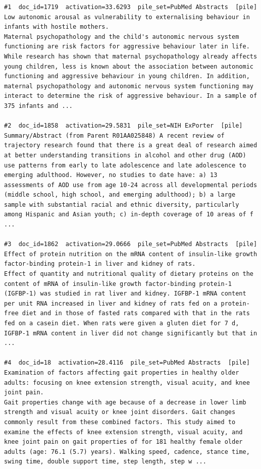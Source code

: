 \begin{verbatim}
#1  doc_id=1719  activation=33.6293  pile_set=PubMed Abstracts  [pile]
Low autonomic arousal as vulnerability to externalising behaviour in infants with hostile mothers.
Maternal psychopathology and the child's autonomic nervous system functioning are risk factors for aggressive behaviour later in life. While research has shown that maternal psychopathology already affects young children, less is known about the association between autonomic functioning and aggressive behaviour in young children. In addition, maternal psychopathology and autonomic nervous system functioning may interact to determine the risk of aggressive behaviour. In a sample of 375 infants and ...

#2  doc_id=1858  activation=29.5831  pile_set=NIH ExPorter  [pile]
Summary/Abstract (from Parent R01AA025848) A recent review of trajectory research found that there is a great deal of research aimed at better understanding transitions in alcohol and other drug (AOD) use patterns from early to late adolescence and late adolescence to emerging adulthood. However, no studies to date have: a) 13 assessments of AOD use from age 10-24 across all developmental periods (middle school, high school, and emerging adulthood); b) a large sample with substantial racial and ethnic diversity, particularly among Hispanic and Asian youth; c) in-depth coverage of 10 areas of f ...

#3  doc_id=1862  activation=29.0666  pile_set=PubMed Abstracts  [pile]
Effect of protein nutrition on the mRNA content of insulin-like growth factor-binding protein-1 in liver and kidney of rats.
Effect of quantity and nutritional quality of dietary proteins on the content of mRNA of insulin-like growth factor-binding protein-1 (IGFBP-1) was studied in rat liver and kidney. IGFBP-1 mRNA content per unit RNA increased in liver and kidney of rats fed on a protein-free diet and in those of fasted rats compared with that in the rats fed on a casein diet. When rats were given a gluten diet for 7 d, IGFBP-1 mRNA content in liver did not change significantly but that in ...

#4  doc_id=18  activation=28.4116  pile_set=PubMed Abstracts  [pile]
Examination of factors affecting gait properties in healthy older adults: focusing on knee extension strength, visual acuity, and knee joint pain.
Gait properties change with age because of a decrease in lower limb strength and visual acuity or knee joint disorders. Gait changes commonly result from these combined factors. This study aimed to examine the effects of knee extension strength, visual acuity, and knee joint pain on gait properties of for 181 healthy female older adults (age: 76.1 (5.7) years). Walking speed, cadence, stance time, swing time, double support time, step length, step w ...


\end{verbatim}
